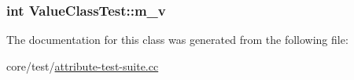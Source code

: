 \subsubsection[{\texorpdfstring{m\+\_\+v}{m_v}}]{\setlength{\rightskip}{0pt plus 5cm}int Value\+Class\+Test\+::m\+\_\+v\hspace{0.3cm}{\ttfamily [private]}}\hypertarget{classValueClassTest_a3a7b7e82d6c11938e6d9fcc4c87a42fd}{}\label{classValueClassTest_a3a7b7e82d6c11938e6d9fcc4c87a42fd}


The documentation for this class was generated from the following file\+:\begin{DoxyCompactItemize}
\item 
core/test/\hyperlink{attribute-test-suite_8cc}{attribute-\/test-\/suite.\+cc}\end{DoxyCompactItemize}
